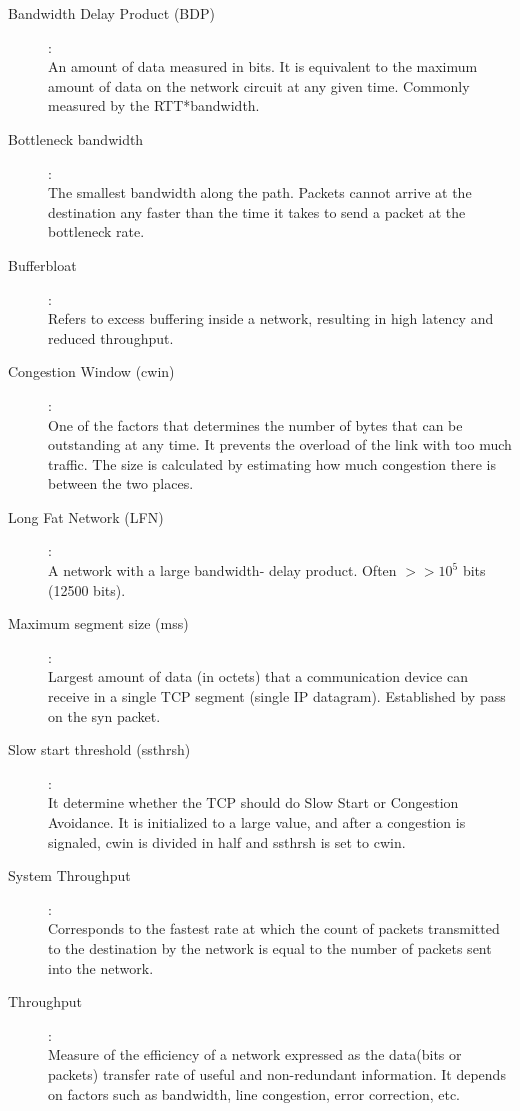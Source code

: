 \begin{description}

\item [Bandwidth Delay Product (BDP)]:\hfill \\  An amount of data measured in
bits. It is equivalent to the maximum amount of data on the network circuit at
any given time. Commonly measured by the RTT*bandwidth.

\item[Bottleneck bandwidth]: \hfill \\  The smallest bandwidth along the path.
Packets cannot arrive at the destination any faster than the time it takes to
send a packet at the bottleneck rate.

\item [Bufferbloat]:\hfill \\  Refers to excess buffering inside a network,
resulting in high latency and reduced throughput.

\item [Congestion Window (cwin)]: \hfill \\  One of the factors that
determines the number of bytes that can be outstanding at any time. It
prevents the overload of the link with too much traffic. The size is
calculated by estimating how much congestion there is between the two places.

\item [Long Fat Network (LFN)]:\hfill \\ A network with a large bandwidth-
delay product. Often $>> 10^5$ bits (12500 bits). 

\item [Maximum segment size (mss)]: \hfill \\  Largest amount of data (in
octets) that a communication device can receive in a single TCP segment
(single IP datagram). Established by pass on the syn packet.

\item [Slow start threshold (ssthrsh)]: \hfill \\  It determine whether the
TCP should do Slow Start or Congestion Avoidance. It is initialized to a large
value, and after a congestion is signaled, cwin is divided in half and ssthrsh
is set to cwin.

\item [System Throughput]:\hfill \\ Corresponds to the fastest rate at which
the count of packets transmitted to the destination by the network is equal to
the number of packets sent into the network.

\item [Throughput]: \hfill\\ Measure of the efficiency of a network expressed
as the data(bits or packets) transfer rate of useful and  non-redundant
information. It depends on factors such as bandwidth, line congestion, error
correction, etc.

\end{description}
